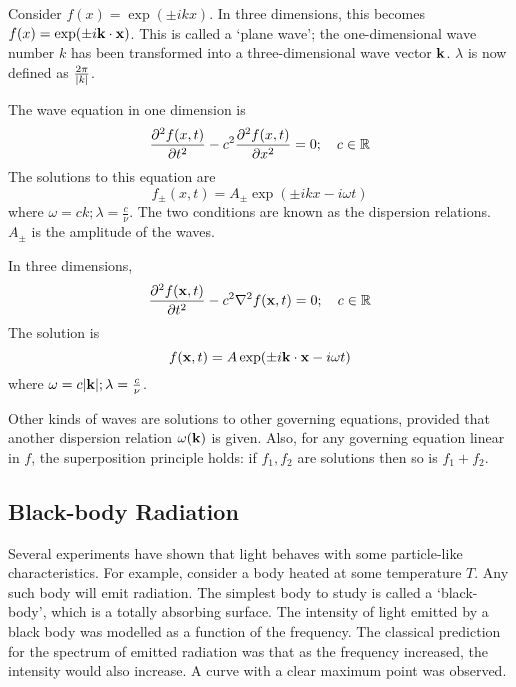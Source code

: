 Consider \( f(x) = \exp(\pm i k x) \).
In three dimensions, this becomes \( f(x) = \exp(\pm i \vb k \cdot \vb x) \).
This is called a `plane wave'; the one-dimensional wave number \( k \) has been transformed into a three-dimensional wave vector \( \vb k \).
\( \lambda \) is now defined as \( \frac{2\pi}{\abs{k}} \).

The wave equation in one dimension is
\[ \pdv[2]{f(x,t)}{t} - c^2 \pdv[2]{f(x,t)}{x} = 0;\quad c \in \mathbb R \]
The solutions to this equation are
\[ f_\pm (x,t) = A_\pm \exp(\pm i k x - i \omega t) \]
where \( \omega = c k; \lambda = \frac{c}{\nu} \).
The two conditions are known as the dispersion relations.
\( A_\pm \) is the amplitude of the waves.

In three dimensions,
\[ \pdv[2]{f(\vb x,t)}{t} - c^2 \laplacian f(\vb x,t) = 0;\quad c \in \mathbb R \]
The solution is
\[ f (\vb x,t) = A \exp(\pm i \vb k \cdot \vb x - i \omega t) \]
where \( \omega = c \abs{\vb k}; \lambda = \frac{c}{\nu} \).

\begin{note}
    Other kinds of waves are solutions to other governing equations, provided that another dispersion relation \( \omega(\vb k) \) is given.
    Also, for any governing equation linear in \( f \), the superposition principle holds: if \( f_1, f_2 \) are solutions then so is \( f_1 + f_2 \).
\end{note}

\subsection{Black-body Radiation}
Several experiments have shown that light behaves with some particle-like characteristics.
For example, consider a body heated at some temperature \( T \).
Any such body will emit radiation.
The simplest body to study is called a `black-body', which is a totally absorbing surface.
The intensity of light emitted by a black body was modelled as a function of the frequency.
The classical prediction for the spectrum of emitted radiation was that as the frequency increased, the intensity would also increase.
A curve with a clear maximum point was observed.
